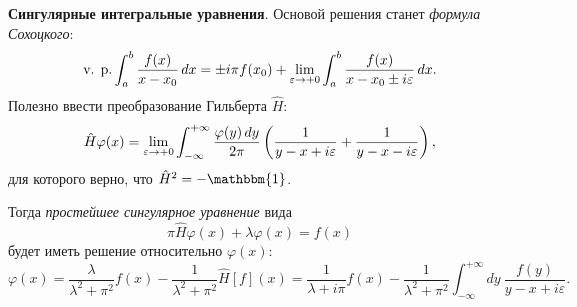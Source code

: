 \textbf{Сингулярные интегральные уравнения}. Основой решения станет \textit{формула Сохоцкого}:
\begin{equation}
		\text{v. p.} \int_{a}^{b} \frac{f(x)}{x-x_0} \, d x = 
		\pm i \pi f(x_0) + \lim_{\varepsilon \to + 0} \int_{a}^{b} \frac{f(x)}{x-x_0 \pm i \varepsilon} \, d x.
\end{equation}
Полезно ввести преобразование Гильберта $\hat{H}$:
\begin{align*}
	\hat{H} \varphi(x) 
	=
	\lim_{\varepsilon \to + 0} \int_{-\infty}^{+\infty} \frac{\varphi(y) \, d y}{2\pi} \left(
		\frac{1}{y-x + i \varepsilon} + \frac{1}{y-x-i \varepsilon}
	\right),
\end{align*}
для которого верно, что $\hat{H}^2 = - \mathbbm{1}$.

Тогда \textit{простейшее сингулярное уравнение} вида
\begin{equation}
	\pi \hat{H} \varphi(x)  + \lambda \varphi(x) = f(x)
\end{equation}
будет иметь решение относительно $\varphi(x)$:
\begin{equation}
	 \varphi(x) = \frac{\lambda}{\lambda^2 + \pi^2} f(x) - \frac{1}{\lambda^2 + \pi^2} \hat{H}[f](x) = \frac{1}{\lambda + i \pi} f(x) - \frac{1}{\lambda^2 + \pi^2} \int_{-\infty}^{+\infty}  dy\ \frac{f(y)}{y-x + i \varepsilon}.
\end{equation}

